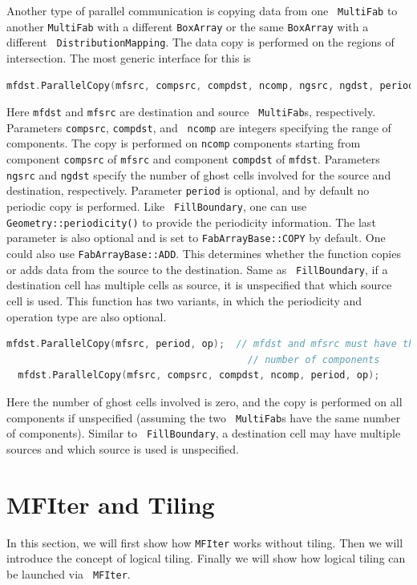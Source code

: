 {{Another type of parallel communication is copying data from one {\tt
  MultiFab} to another {\tt MultiFab} with a different {\tt BoxArray}
or the same {\tt BoxArray} with a different {\tt
  DistributionMapping}.   The data copy is performed on the regions of
intersection.  The most generic interface for this is
\begin{lstlisting}[language=cpp]
  mfdst.ParallelCopy(mfsrc, compsrc, compdst, ncomp, ngsrc, ngdst, period, op);
\end{lstlisting}
Here {\tt mfdst} and {\tt mfsrc} are destination and source {\tt
  MultiFab}s, respectively.  Parameters {\tt compsrc}, {\tt compdst}, and {\tt
  ncomp} are integers specifying the range of components.  The copy is
performed on {\tt ncomp} components starting from component {\tt compsrc} of
{\tt mfsrc} and component {\tt compdst} of {\tt mfdst}.  Parameters {\tt
  ngsrc} and {\tt ngdst} specify the number of ghost cells involved for
the source and destination, respectively.  Parameter {\tt period} is
optional, and by default no periodic copy is performed.  Like {\tt
  FillBoundary}, one can use {\tt Geometry::periodicity()} to provide
the periodicity information.  The last parameter is also optional and
is set to {\tt FabArrayBase::COPY} by default.  One could also use
{\tt FabArrayBase::ADD}.  This determines whether the function copies
or adds data from the source to the destination.  Same as {\tt
  FillBoundary}, if a destination cell has multiple cells as source,
it is unspecified that which source cell is used.  This function has
two variants, in which the periodicity and operation type are also
optional.
\begin{lstlisting}[language=cpp]
  mfdst.ParallelCopy(mfsrc, period, op);  // mfdst and mfsrc must have the same
                                          // number of components
  mfdst.ParallelCopy(mfsrc, compsrc, compdst, ncomp, period, op);
\end{lstlisting}
Here the number of ghost cells involved is zero, and the copy is
performed on all components if unspecified (assuming the two {\tt
  MultiFab}s have the same number of components).  Similar to {\tt
  FillBoundary}, a destination cell may have multiple sources and
which source is used is unspecified.

\section{MFIter and Tiling}
\label{sec:basics:mfiter}

In this section, we will first show how {\tt MFIter} works without
tiling.  Then we will introduce the concept of logical tiling.
Finally we will show how logical tiling can be launched via {\tt
  MFIter}. 

}}
